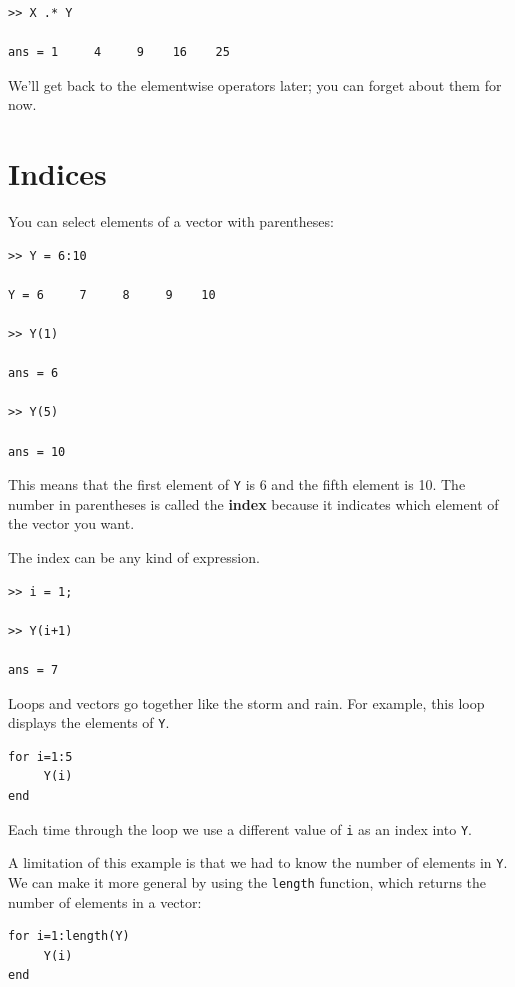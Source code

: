 \documentclass{book}
\begin{document}
\begin{verbatim}
>> X .* Y

ans = 1     4     9    16    25
\end{verbatim}

We'll get back to the elementwise operators later; you can
forget about them for now.




\section{Indices}

You can select elements of a vector with parentheses:

\begin{verbatim}
>> Y = 6:10

Y = 6     7     8     9    10

>> Y(1)

ans = 6

>> Y(5)

ans = 10
\end{verbatim}

This means that the first element of {\tt Y} is 6 and the
fifth element is 10.  The number in parentheses is called
the {\bf index} because it indicates which element of the
vector you want.

The index can be any kind of expression.

\begin{verbatim}
>> i = 1;

>> Y(i+1)

ans = 7
\end{verbatim}

Loops and vectors go together like the storm and rain.
For example, this loop displays the elements of {\tt Y}.

\begin{verbatim}
for i=1:5
     Y(i)
end
\end{verbatim}

Each time through the loop we use a different value of {\tt i}
as an index into {\tt Y}.

A limitation of this example is that we had to know the number
of elements in {\tt Y}.  We can make it more general by using
the {\tt length} function, which returns the number of elements
in a vector:

\begin{verbatim}
for i=1:length(Y)
     Y(i)
end
\end{verbatim}
\end{document}
